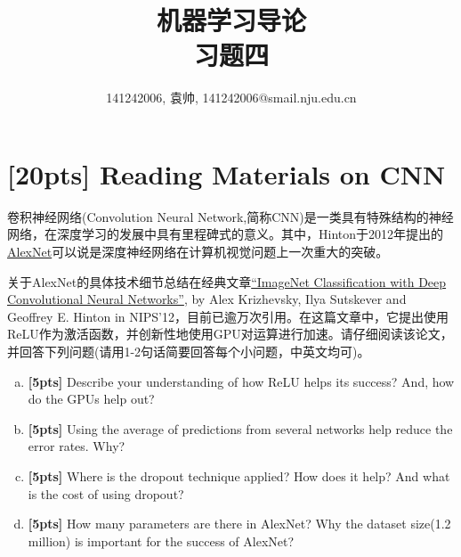 \documentclass[a4paper,UTF8]{article}
\numberwithin{equation}{section}
\theoremstyle{definition}
\begin{document}
\title{机器学习导论\\
习题四}
\author{141242006, 袁帅, 141242006@smail.nju.edu.cn}
\maketitle
\vspace{0.08in}
\section{\textbf{[20pts]} Reading Materials on CNN}
卷积神经网络(Convolution Neural Network,简称CNN)是一类具有特殊结构的神经网络，在深度学习的发展中具有里程碑式的意义。其中，Hinton于2012年提出的\href{https://en.wikipedia.org/wiki/AlexNet}{AlexNet}可以说是深度神经网络在计算机视觉问题上一次重大的突破。

关于AlexNet的具体技术细节总结在经典文章\href{https://papers.nips.cc/paper/4824-imagenet-classification-with-deep-convolutional-neural-networks}{“ImageNet Classification with Deep Convolutional Neural Networks”}, by Alex Krizhevsky, Ilya Sutskever and Geoffrey E. Hinton in NIPS'12，目前已逾万次引用。在这篇文章中，它提出使用ReLU作为激活函数，并创新性地使用GPU对运算进行加速。请仔细阅读该论文，并回答下列问题(请用1-2句话简要回答每个小问题，中英文均可)。

\begin{enumerate}[(a)]
\item \textbf{[5pts]} Describe your understanding of how ReLU helps its success? And, how do the GPUs help out?
\item \textbf{[5pts]} Using the average of predictions from several networks help reduce the error rates. Why?
\item \textbf{[5pts]} Where is the dropout technique applied? How does it help? And what is the cost of using dropout?
\item \textbf{[5pts]} How many parameters are there in AlexNet? Why the dataset size(1.2 million) is important for the success of AlexNet?
\end{enumerate}
\end{document}
